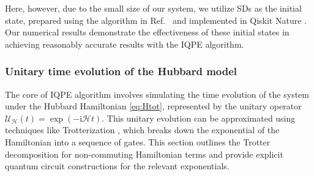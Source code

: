 \documentclass[twocolumn,superscriptaddress,amsmath,amssymb,showpacs,floatfix,preprintnumbers]{revtex4-1}
\newcommand{\rmi}{\mathrm{i}}
\newcommand{\mc}{\mathcal}
\begin{document}
Here, however, due to the small size of our system, we utilize SDs as the initial state, prepared
using the algorithm in Ref.~\cite{Jiang2018} and implemented in Qiskit Nature \cite{QisNat}.
%
Our numerical results demonstrate the effectiveness of these initial states in achieving reasonably
accurate results with the IQPE algorithm.

\subsubsection{Unitary time evolution of the Hubbard model} \label{sss_tim_evo}
The core of IQPE algorithm involves simulating the time evolution of the system under the Hubbard 
Hamiltonian \eqref{eq:Htot}, represented by the unitary operator 
$ \mc {U_H} (t) = \exp(- \rmi \mc{H} t) $.
%
This unitary evolution can be approximated using techniques like Trotterization 
\cite{Hatano2005}, which breaks down the exponential of the Hamiltonian into a sequence of gates.
%
This section outlines the Trotter decomposition for non-commuting Hamiltonian terms and provide
explicit quantum circuit constructions for the relevant exponentials.
\end{document}
